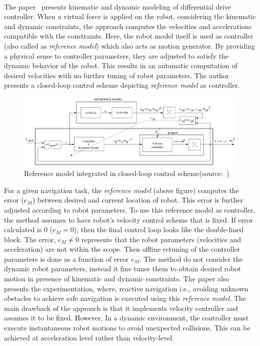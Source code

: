 \paragraph{}The paper~\cite{asensio2002kinematic} presents kinematic and dynamic modeling of differential drive controller. When a virtual force is applied on the robot, considering the kinematic and dynamic constraints, the approach computes the velocities and accelerations compatible with the constraints. Here, the robot model itself is used as controller (also called as \textit{reference model}) which also acts as motion generator. By providing a physical sense to controller parameters, they are adjusted to satisfy the dynamic behavior of the robot. This results in an automatic computation of desired velocities with no further tuning of robot parameters. The author presents a closed-loop control scheme depicting \textit{reference model} as controller.

\begin{figure}[h!]
\begin{center}
	\includegraphics[scale=0.35]{images/reference-model.png}
\end{center}
	\caption{Reference model integrated in closed-loop control scheme(source:~\cite{asensio2002kinematic})}
	\label{fig:reference-model}
\end{figure}


For a given navigation task, the \textit{reference model} (above figure) computes the error ($e_M$) between desired and current location of robot. This error is further adjusted according to robot parameters. To use this reference model as controller, the method assumes to have robot's velocity control scheme that is fixed. If error calculated is 0 ($e_M = 0$), then the final control loop looks like the double-lined block. The error, $e_M \neq 0$ represents that the robot parameters (velocities and acceleration) are not within the scope. Then offline retuning of the controller parameters is done as a function of error $e_M$. The method do not consider the dynamic robot parameters, instead it fine tunes them to obtain desired robot motion in presence of kinematic and dynamic constraints. The paper also presents the experimentation, where, reactive navigation i.e., avoiding unknown obstacles to achieve safe navigation is executed using this \textit{reference model}. The main drawback of the approach is that it implements velocity controller and assumes it to be fixed. However, In a dynamic environment, the controller must execute instantaneous robot motions to avoid unexpected collisions. This can be achieved at acceleration level rather than velocity-level.


